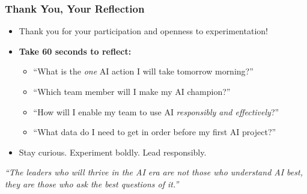 \begin{frame}[fragile]\frametitle{Thank You, Your Reflection}

\begin{itemize}
  \item Thank you for your participation and openness to experimentation!
  \item \textbf{Take 60 seconds to reflect:}
    \begin{itemize}
      \item ``What is the \textit{one} AI action I will take tomorrow morning?''
      \item ``Which team member will I make my AI champion?''
      \item ``How will I enable my team to use AI \textit{responsibly and effectively}?''
      \item ``What data do I need to get in order before my first AI project?''
    \end{itemize}
  \item Stay curious. Experiment boldly. Lead responsibly.
\end{itemize}

\vspace{0.5em}
\begin{center}
\textit{``The leaders who will thrive in the AI era are not those who understand AI best, they are those who ask the best questions of it.''}
\end{center}

\end{frame}